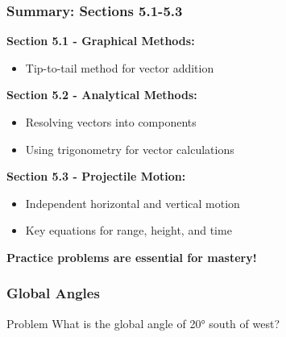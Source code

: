 \documentclass{beamer}
\begin{document}
\begin{frame}
\frametitle{Summary: Sections 5.1-5.3}
\textbf{Section 5.1 - Graphical Methods:}
\begin{itemize}
    \item Tip-to-tail method for vector addition
\end{itemize}
\pause

\textbf{Section 5.2 - Analytical Methods:}
\begin{itemize}
    \item Resolving vectors into components
    \item Using trigonometry for vector calculations
\end{itemize}
\pause

\textbf{Section 5.3 - Projectile Motion:}
\begin{itemize}
    \item Independent horizontal and vertical motion
    \item Key equations for range, height, and time
\end{itemize}
\pause

\vspace{0.3cm}
\textbf{Practice problems are essential for mastery!}
\end{frame}

\begin{frame}
\frametitle{Global Angles}

\begin{block}{Problem}
What is the global angle of 20° south of west?
\end{block}

\begin{center}
\end{center}
\end{frame}
\end{document}
